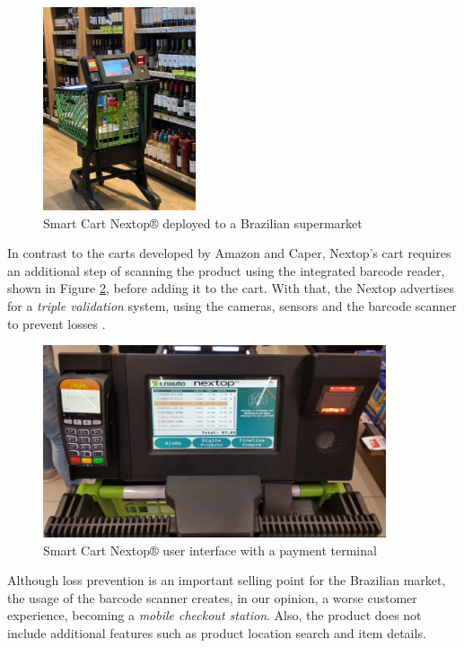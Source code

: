\documentclass[openright]{normas-utf-tex} %
\begin{document}
\begin{figure}[H]
	\centering
	\includegraphics[width=0.4\textwidth]{./images/nextop.jpeg}
	\caption[Smart Cart Nextop® deployed to a Brazilian supermarket]{Smart Cart Nextop® deployed to a Brazilian supermarket}
	\label{fig:nextop}
\end{figure}

In contrast to the carts developed by Amazon and Caper, Nextop's cart requires
an additional step of scanning the product using the integrated barcode reader,
shown in Figure \ref{fig:nextopui}, before adding it to the cart. With that, the
Nextop advertises for a \textit{triple validation} system, using the cameras,
sensors and the barcode scanner to prevent losses \cite{Nextop2022}.

\begin{figure}[H]
	\centering
	\includegraphics[width=0.9\textwidth]{./images/nextop2.png}
    \caption[Smart Cart Nextop® user interface with a payment terminal]{Smart Cart Nextop® user interface with a payment terminal}
	\label{fig:nextopui}
\end{figure}

Although loss prevention is an important selling point for the Brazilian market,
the usage of the barcode scanner creates, in our opinion, a worse customer
experience, becoming a \textit{mobile checkout station}. Also, the product does not
include additional features such as product location search and item details. 
\end{document}
